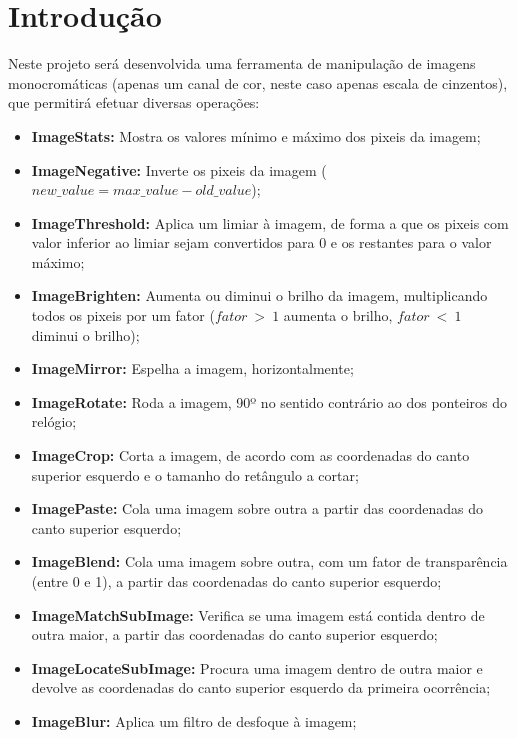 
\chapter{Introdução}
\label{ch:introducao}
{

Neste projeto será desenvolvida uma ferramenta de manipulação de imagens monocromáticas (apenas um canal de cor, neste caso apenas escala de cinzentos), que permitirá efetuar diversas operações:

\begin{itemize}
    \item \textbf{ImageStats:} Mostra os valores mínimo e máximo dos pixeis da imagem;
    \item \textbf{ImageNegative:} Inverte os pixeis da imagem ($new\_value = max\_value - old\_value$);
    \item \textbf{ImageThreshold:} Aplica um limiar à imagem, de forma a que os pixeis com valor inferior ao limiar sejam convertidos para 0 e os restantes para o valor máximo;
    \item \textbf{ImageBrighten:} Aumenta ou diminui o brilho da imagem, multiplicando todos os pixeis por um fator ($fator~>~1$ aumenta o brilho, $fator~<~1$ diminui o brilho);
    \item \textbf{ImageMirror:} Espelha a imagem, horizontalmente;
    \item \textbf{ImageRotate:} Roda a imagem, 90º no sentido contrário ao dos ponteiros do relógio;
    \item \textbf{ImageCrop:} Corta a imagem, de acordo com as coordenadas do canto superior esquerdo e o tamanho do retângulo a cortar;
    \item \textbf{ImagePaste:} Cola uma imagem sobre outra a partir das coordenadas do canto superior esquerdo;
    \item \textbf{ImageBlend:} Cola uma imagem sobre outra, com um fator de transparência (entre 0 e 1), a partir das coordenadas do canto superior esquerdo;
    \item \textbf{ImageMatchSubImage:} Verifica se uma imagem está contida dentro de outra maior, a partir das coordenadas do canto superior esquerdo;
    \item \textbf{ImageLocateSubImage:} Procura uma imagem dentro de outra maior e devolve as coordenadas do canto superior esquerdo da primeira ocorrência;
    \item \textbf{ImageBlur:} Aplica um filtro de desfoque à imagem;
\end{itemize}

}
